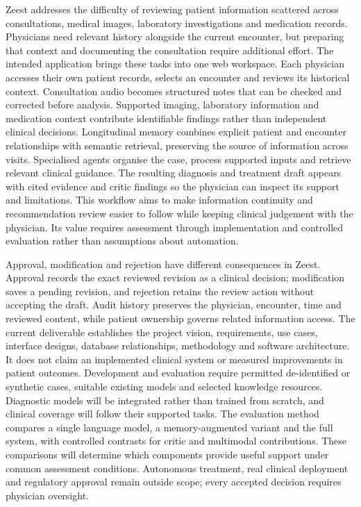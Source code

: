 Zeest addresses the difficulty of reviewing patient information scattered across consultations, medical images, laboratory investigations and medication records. Physicians need relevant history alongside the current encounter, but preparing that context and documenting the consultation require additional effort. The intended application brings these tasks into one web workspace. Each physician accesses their own patient records, selects an encounter and reviews its historical context. Consultation audio becomes structured notes that can be checked and corrected before analysis. Supported imaging, laboratory information and medication context contribute identifiable findings rather than independent clinical decisions. Longitudinal memory combines explicit patient and encounter relationships with semantic retrieval, preserving the source of information across visits. Specialised agents organise the case, process supported inputs and retrieve relevant clinical guidance. The resulting diagnosis and treatment draft appears with cited evidence and critic findings so the physician can inspect its support and limitations. This workflow aims to make information continuity and recommendation review easier to follow while keeping clinical judgement with the physician. Its value requires assessment through implementation and controlled evaluation rather than assumptions about automation.

Approval, modification and rejection have different consequences in Zeest. Approval records the exact reviewed revision as a clinical decision; modification saves a pending revision, and rejection retains the review action without accepting the draft. Audit history preserves the physician, encounter, time and reviewed content, while patient ownership governs related information access. The current deliverable establishes the project vision, requirements, use cases, interface designs, database relationships, methodology and software architecture. It does not claim an implemented clinical system or measured improvements in patient outcomes. Development and evaluation require permitted de-identified or synthetic cases, suitable existing models and selected knowledge resources. Diagnostic models will be integrated rather than trained from scratch, and clinical coverage will follow their supported tasks. The evaluation method compares a single language model, a memory-augmented variant and the full system, with controlled contrasts for critic and multimodal contributions. These comparisons will determine which components provide useful support under common assessment conditions. Autonomous treatment, real clinical deployment and regulatory approval remain outside scope; every accepted decision requires physician oversight.
